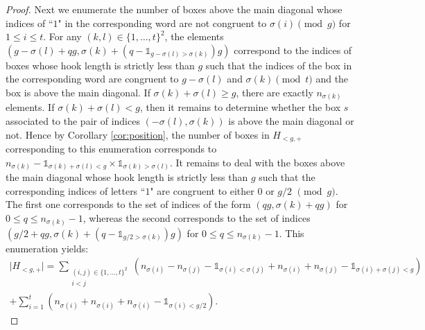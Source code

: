 \documentclass[11pt,letterpaper]{amsart}
\DeclareMathOperator{\I}{I}
\numberwithin{equation}{section}
\numberwithin{df}{section}
\begin{document}
\begin{proof}
Next we enumerate the number of boxes above the main diagonal whose indices of ``$1$" in the corresponding word are not congruent to $\sigma(i)\pmod{g}$ for $1\leq i \leq t$.
For any $(k,l)\in\lbrace 1,\dots,t\rbrace^2$, the elements $(g-\sigma(l)+qg,\sigma(k)+(q-\mathds{1}_{g-\sigma(l)>\sigma(k)})g)$ correspond to the indices of boxes whose hook length is strictly less than $g$ such that the indices of the box in the corresponding word are congruent to $g-\sigma(l)$ and $\sigma(k)\pmod{t}$ and the box is above the main diagonal.
If $\sigma(k)+\sigma(l)\geq g$, there are exactly $n_{\sigma(k)}$ elements. If $\sigma(k)+\sigma(l)<g$, then it remains to determine whether the box $s$ associated to the pair of indices $(-\sigma(l),\sigma(k))$ is above the main diagonal or not. Hence by Corollary \ref{cor:position}, the number of boxes in $H_{<g,+}$ corresponding to this enumeration corresponds to $n_{\sigma(k)}-\mathds{1}_{\sigma(k)+\sigma(l)<g}\times\mathds{1}_{\sigma(k)>\sigma(l)}$. 
It remains to deal with the boxes above the main diagonal  whose hook length is strictly less than  $g$ such that the corresponding indices of letters ``$1$" are congruent to either $0$ or $g/2$ $\pmod{g}$. The first one corresponds to the set of indices of the form $(qg,\sigma(k)+qg)$ for $0\leq q \leq n_{\sigma(k)}-1$, whereas the second corresponds to the set of indices $(g/2+qg,\sigma(k)+(q-\mathds{1}_{g/2>\sigma(k)})g)$ for $0\leq q \leq n_{\sigma(k)}-1$.
This enumeration yields:
\begin{multline}\label{eq:interhplus}
\lvert H_{<g,+}\rvert=\sum_{\substack{(i,j)\in \lbrace 1,\dots ,t\rbrace^2\\i<j}}\left(n_{\sigma(i)}-n_{\sigma(j)}-\mathds{1}_{\sigma(i)<\sigma(j)}+n_{\sigma(i)}+n_{\sigma(j)}-\mathds{1}_{\sigma(i)+\sigma(j)<g}\right)\\
+\sum_{i=1}^t\left(n_{\sigma(i)}+n_{\sigma(i)}+n_{\sigma(i)}-\mathds{1}_{\sigma(i)<g/2}\right).
\end{multline}


\end{proof}
\end{document}
